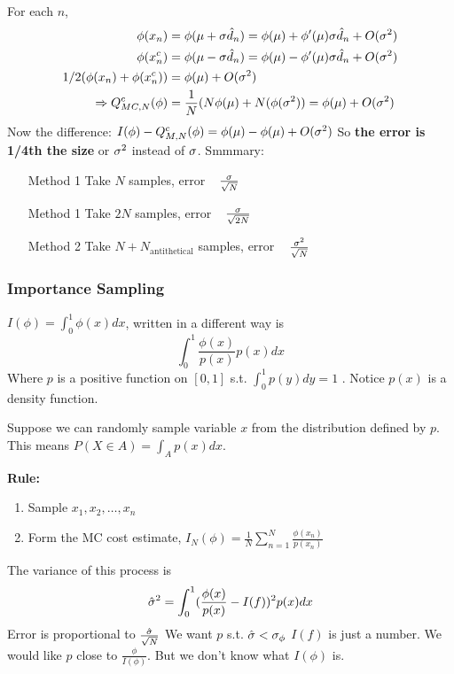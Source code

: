 For each $n$,
\begin{align*}
 \phi(x_n) &= \phi(\mu + \sigma \hat d_n) = \phi(\mu) + \phi'(\mu)\sigma
 \hat d_n + O(\sigma^2)\\
 \phi(x_n^c) &= \phi(\mu - \sigma \hat d_n) = \phi(\mu) - \phi'(\mu)\sigma
 \hat d_n + O(\sigma^2)\\
1/2(\phi(x_n) + \phi(x_n^c)) &= \phi(\mu) + O(\sigma^2)\\
\Rightarrow Q^c_{MC,N}(\phi) &= \frac{1}{N}(N\phi(\mu) +
N(\phi(\sigma^2)) = \phi(\mu) + O(\sigma^2)\\
\end{align*}
Now the difference: $I(\phi) - Q_{M,N}^c(\phi) = \phi(\mu) - \phi(\mu)
+ O(\sigma^2)$
So \textbf{the error is 1/4th the size} or $\sigma^2$ instead of
$\sigma$.
Smmmary:
\begin{enumerate}
\item[Method 1] Take $N$ samples, error ~ $\frac{\sigma}{\sqrt{N}}$
\item[Method 1] Take $2N$ samples, error ~ $\frac{\sigma}{\sqrt{2N}}$
\item[Method 2] Take $N+N_{\text{antithetical}}$ samples, error ~ $\frac{\sigma^2}{\sqrt{N}}$
\end{enumerate}

\subsubsection{Importance Sampling}
\label{sec:importancesampling}
$I(\phi) = \int_0^1\phi(x)dx$, written in a different way
is $$\int_0^1 \frac{\phi(x)}{p(x)}p(x)dx$$
Where $p$ is a positive function on $[0,1]$ s.t. $\int_0^1 p(y)dy=1$
. Notice $p(x)$ is a density function.

Suppose we can randomly sample variable $x$ from the distribution defined by
$p$. This means $P(X\in A) = \int_A p(x)dx$.

\noi \textbf{Rule:}
\begin{enumerate}
\item Sample $x_1, x_2, \dots, x_n$
\item Form the MC cost estimate, $I_N(\phi) = \frac{1}{N}\sum_{n=1}^N\frac{\phi(x_n)}{p(x_n)}$
\end{enumerate}

The variance of this process is $$\hat {\sigma}^2 = \int_0^1
(\frac{\phi(x)}{p(x)} - I(f))^2p(x)dx$$
Error is proportional to $\frac{\hat{\sigma}}{\sqrt{N}}$
We want $p$ s.t. $\hat {\sigma} < \sigma_{\phi}$
$I(f)$ is just a number. We would like $p$ close to
$\frac{\phi}{I(\phi)}$. But we don't know what $I(\phi)$ is.

